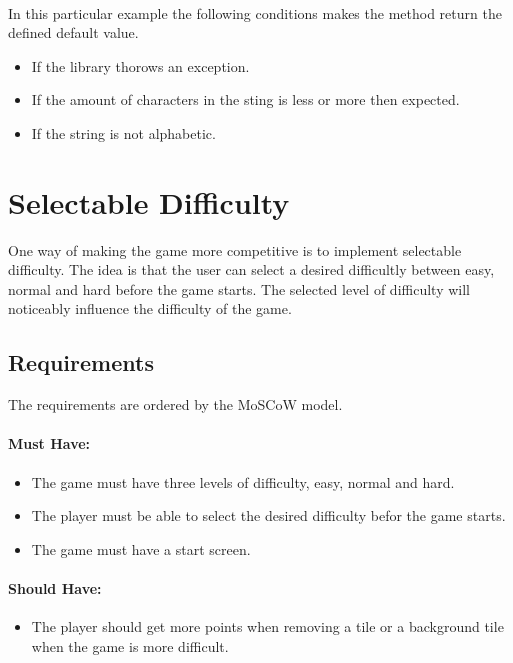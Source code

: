 \documentclass{article}
\begin{document}
\paragraph{} In this particular example the following conditions makes the method return the defined default value.
\begin{itemize}
	\item If the library thorows an exception.
	\item If the amount of characters in the sting is less or more then expected.
	\item If the string is not alphabetic.
\end{itemize}

\section{Selectable Difficulty}
One way of making the game more competitive is to implement selectable difficulty. The idea is that the user can select a desired difficultly between easy, normal and hard before the game starts. The selected level of difficulty will noticeably influence the difficulty of the game.   

\subsection{Requirements}
The requirements are ordered by the MoSCoW model.

\paragraph{Must Have:}
\begin{itemize}
	\item The game must have three levels of difficulty, easy, normal and hard.
	\item The player must be able to select the desired difficulty befor the game starts.
	\item The game must have a start screen.
\end{itemize}

\paragraph{Should Have:}
\begin{itemize}
	\item The player should get more points when removing a tile or a background tile when the game is more difficult.
\end{itemize}
\end{document}
